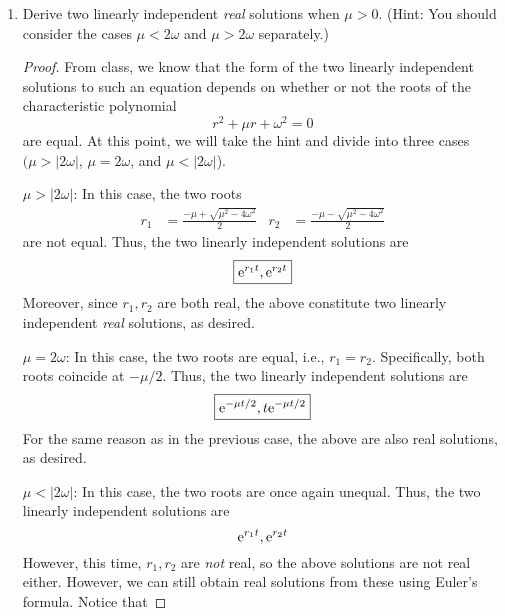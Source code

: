 \documentclass[../psets.tex]{subfiles}
\begin{document}
\begin{enumerate}
    \begin{enumerate}
        \item Derive two linearly independent \emph{real} solutions when $\mu>0$. (Hint: You should consider the cases $\mu<2\omega$ and $\mu>2\omega$ separately.)
        \begin{proof}
            From class, we know that the form of the two linearly independent solutions to such an equation depends on whether or not the roots of the characteristic polynomial
            \begin{equation*}
                r^2+\mu r+\omega^2 = 0
            \end{equation*}
            are equal. At this point, we will take the hint and divide into three cases $(\mu>|2\omega|$, $\mu=2\omega$, and $\mu<|2\omega|$).\par
            \underline{$\mu>|2\omega|$}: In this case, the two roots
            \begin{align*}
                r_1 &= \frac{-\mu+\sqrt{\mu^2-4\omega^2}}{2}&
                r_2 &= \frac{-\mu-\sqrt{\mu^2-4\omega^2}}{2}
            \end{align*}
            are not equal. Thus, the two linearly independent solutions are
            \begin{equation*}
                \boxed{\e[r_1t],\e[r_2t]}
            \end{equation*}
            Moreover, since $r_1,r_2$ are both real, the above constitute two linearly independent \emph{real} solutions, as desired.\par 
            \underline{$\mu=2\omega$}: In this case, the two roots are equal, i.e., $r_1=r_2$. Specifically, both roots coincide at $-\mu/2$. Thus, the two linearly independent solutions are
            \begin{equation*}
                \boxed{\e[-\mu t/2],t\e[-\mu t/2]}
            \end{equation*}
            For the same reason as in the previous case, the above are also real solutions, as desired.\par
            \underline{$\mu<|2\omega|$}: In this case, the two roots are once again unequal. Thus, the two linearly independent solutions are
            \begin{equation*}
                \e[r_1t],\e[r_2t]
            \end{equation*}
            However, this time, $r_1,r_2$ are \emph{not} real, so the above solutions are not real either. However, we can still obtain real solutions from these using Euler's formula. Notice that

\end{proof}
\end{enumerate}
\end{enumerate}
\end{document}

